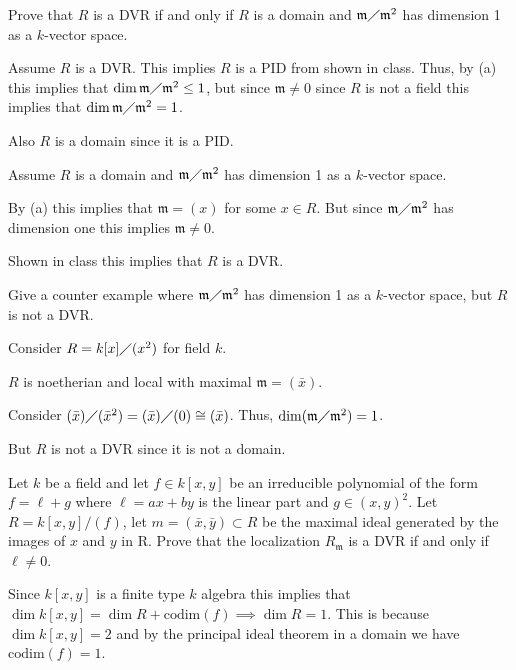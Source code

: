 \documentclass[12pt, letterpaper]{article}
\newcommand{\mf}[1]{\mathfrak{#1}}
\newcommand{\codim}{\mathrm{codim}}
\begin{document}
\begin{subproblem}{}
    Prove that $R$ is a DVR if and only if $R$ is a domain and $\mf{m} \diagup \mf{m}^2$ has dimension 1 as a
$k$-vector space.
\end{subproblem}
\begin{problemproof}
    Assume $R$ is a DVR. This implies $R$ is a PID from shown in class. Thus, by (a) this implies that $\dim \mf{m} \diagup \mf{m}^2 \leq 1$, but since $\mf{m} \neq 0$ since $R$ is not a field this implies that $\dim \mf{m} \diagup \mf{m}^2=1$.

    Also $R$ is a domain since it is a PID.

    Assume $R$ is a domain and $\mf{m} \diagup \mf{m}^2$ has dimension 1 as a $k$-vector space.

    By (a) this implies that $\mf{m}=(x)$ for some $x \in R$. But since $\mf{m} \diagup \mf{m}^2$ has dimension one this implies $\mf{m} \neq 0$.

    Shown in class this implies that $R$ is a DVR.
\end{problemproof}

\begin{subproblem}{}
    Give a counter example where $\mf{m} \diagup \mf{m}^2$ has dimension 1 as a $k$-vector space, but $R$ is not a DVR.
\end{subproblem}
\begin{problemproof}
    Consider $R= k[x] \diagup (x^2)$ for field $k$.

    $R$ is noetherian and local with maximal $\mf{m}=(\bar{x})$.

    Consider $(\bar{x}) \diagup (\bar{x}^2) = (\bar{x}) \diagup (0) \cong (\bar{x})$. Thus, $\dim(\mf{m} \diagup \mf{m}^2)=1$.

    But $R$ is not a DVR since it is not a domain.
\end{problemproof}

\begin{problem}{}
    Let $k$ be a field and let $f \in k[x, y]$ be an irreducible polynomial of the form $f = \ell + g$ where
$\ell = ax + by$ is the linear part and $g \in (x, y)^2$. Let $R = k[x, y]/(f )$, let $m = (\bar{x}, \bar{y}) \subset R$ be
the maximal ideal generated by the images of $x$ and $y$ in R. Prove that the localization $R_\mf{m}$
is a DVR if and only if $\ell \neq 0$.
\end{problem}
\begin{problemproof}
    Since $k[x,y]$ is a finite type $k$ algebra this implies that $\dim k[x,y] = \dim R + \codim (f) \implies \dim R = 1$. This is because $\dim k[x,y]=2$ and by the principal ideal theorem in a domain we have $\codim (f) = 1$.
\end{problemproof}
\end{document}
